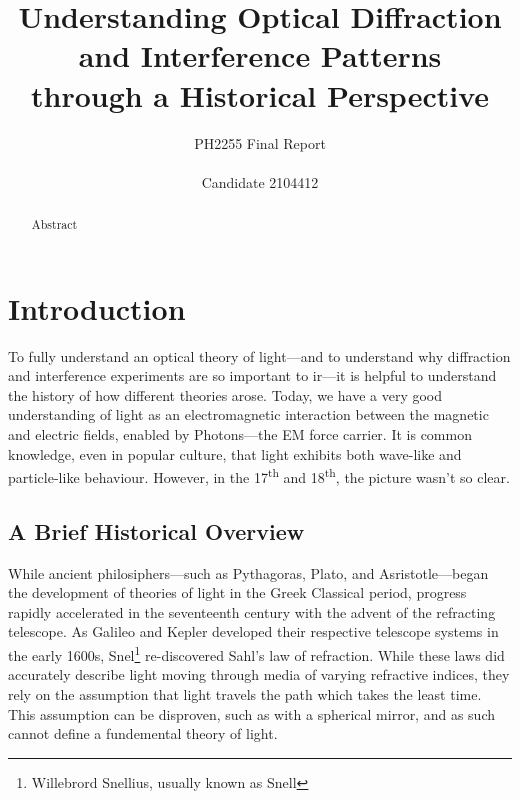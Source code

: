 \documentclass[a4paper]{article}
\title{%
  Understanding Optical Diffraction and Interference Patterns \\through a Historical Perspective}
\author{PH2255 Final Report\\ \\Candidate 2104412}
\begin{document}
\maketitle

\begin{abstract}
Abstract
\end{abstract}

\tableofcontents
\newpage
\section{Introduction} \label{sec:intro}
To fully understand an optical theory of light---and to understand why diffraction and interference experiments are so important to ir---it is helpful to understand the history of how different theories arose. Today, we have a very good understanding of light as an electromagnetic interaction between the magnetic and electric fields, enabled by Photons---the EM force carrier. It is common knowledge, even in popular culture, that light exhibits both wave-like and particle-like behaviour. However, in the 17\textsuperscript{th} and 18\textsuperscript{th}, the picture wasn't so clear.\cite[\S1.3]{RefWorks:doc:60689ea38f08cf86c9dc700e}

\subsection{A Brief Historical Overview} \label{sub:over}

While ancient philosiphers---such as Pythagoras, Plato, and Asristotle---began the development of theories of light in the Greek Classical period, progress rapidly accelerated in the seventeenth century with the advent of the refracting telescope. As Galileo and Kepler developed their respective telescope systems in the early 1600s, Snel\footnote{Willebrord Snellius, usually known as Snell} re-discovered Sahl's law of refraction. While these laws did accurately describe light moving through media of varying refractive indices, they rely on the assumption that light travels the path which takes the least time. This assumption can be disproven, such as with a spherical mirror, and as such cannot define a fundemental theory of light.
\end{document}
